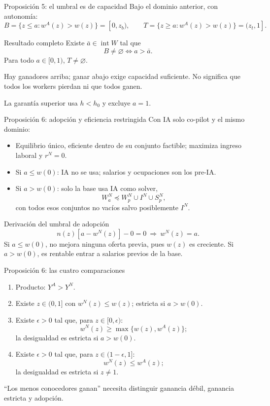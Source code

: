 \documentclass[aspectratio=169,11pt]{beamer}
\begin{document}
\begin{frame}{Proposición 5: el umbral es de capacidad}
Bajo el dominio anterior, con autonomía:
\[
B=\{z\le a:w^A(z)>w(z)\}=[0,z_b),\qquad
T=\{z\ge a:w^A(z)>w(z)\}=(z_t,1].
\]
\begin{block}{Resultado completo}
Existe $\bar a\in\operatorname{int}W$ tal que
\[
 B\ne\varnothing\iff a>\bar a.
\]
Para todo $a\in[0,1)$, $T\ne\varnothing$.
\end{block}
\begin{keybox}Hay ganadores arriba; ganar abajo exige capacidad suficiente. No significa que todos los workers pierdan ni que todos ganen.\end{keybox}
La garantía superior usa $h<h_0$ y excluye $a=1$.
\end{frame}

\begin{frame}{Proposición 6: adopción y eficiencia restringida}
\small
Con IA solo co-pilot y el mismo dominio:
\begin{itemize}
\item Equilibrio único, eficiente dentro de su conjunto factible; maximiza ingreso laboral y $r^N=0$.
\item Si $a\le w(0)$: IA no se usa; salarios y ocupaciones son los pre-IA.
\item Si $a>w(0)$: solo la base usa IA como solver,
\[
W_a^N\preceq W_p^N\cup I^N\cup S_p^N,
\]
con todos esos conjuntos no vacíos salvo posiblemente $I^N$.
\end{itemize}
\begin{block}{Derivación del umbral de adopción}
\[
n(z)[a-w^N(z)]-0=0\ \Rightarrow\ w^N(z)=a.
\]
Si $a\le w(0)$, no mejora ninguna oferta previa, pues $w(z)$ es creciente. Si $a>w(0)$, es rentable entrar a salarios previos de la base.
\end{block}
\end{frame}

\begin{frame}{Proposición 6: las cuatro comparaciones}
\small
\begin{enumerate}
\item Producto: $Y^A>Y^N$.
\item Existe $z\in(0,1]$ con $w^N(z)\le w(z)$; estricta si $a>w(0)$.
\item Existe $\epsilon>0$ tal que, para $z\in[0,\epsilon)$:
\[
 w^N(z)\ge\max\{w(z),w^A(z)\};
\]
la desigualdad es estricta si $a>w(0)$.
\item Existe $\epsilon>0$ tal que, para $z\in(1-\epsilon,1]$:
\[
 w^N(z)\le w^A(z);
\]
la desigualdad es estricta si $z\ne1$.
\end{enumerate}
\begin{keybox}``Los menos conocedores ganan'' necesita distinguir ganancia débil, ganancia estricta y adopción.\end{keybox}
\end{frame}
\end{document}
